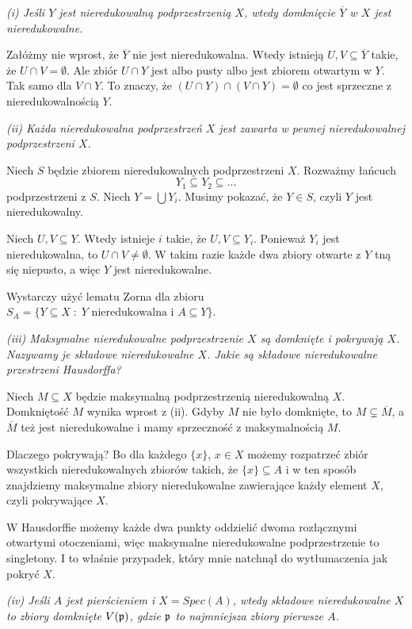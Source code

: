 \documentclass{article}
\begin{document}
\emph{\color{pink}(i) Jeśli $Y$ jest nieredukowalną podprzestrzenią $X$, wtedy domknięcie $\overline Y$ w $X$ jest nieredukowalne.}

Załóżmy nie wprost, że $\overline Y$ nie jest nieredukowalna. Wtedy istnieją $U, V\subseteq \overline Y$ takie, że $U\cap V=\emptyset$. Ale zbiór $U\cap Y$ jest albo pusty albo jest zbiorem otwartym w $Y$. Tak samo dla $V\cap Y$. To znaczy, że $(U\cap Y)\cap(V\cap Y)=\emptyset$ co jest sprzeczne z nieredukowalnością $Y$.

\emph{\color{pink}(ii) Każda nieredukowalna podprzestrzeń $X$ jest zawarta w pewnej nieredukowalnej podprzestrzeni $X$.}

Niech $S$ będzie zbiorem nieredukowalnych podprzestrzeni $X$. Rozważmy łańcuch
$$Y_1\subseteq Y_2\subseteq...$$
podprzestrzeni z $S$. Niech $Y=\bigcup Y_i$. Musimy pokazać, że $Y\in S$, czyli $Y$ jest nieredukowalny.

Niech $U,V\subseteq Y$. Wtedy istnieje $i$ takie, że $U,V\subseteq Y_i$. Ponieważ $Y_i$ jest nieredukowalna, to $U\cap V\neq\emptyset$. W takim razie każde dwa zbiory otwarte z $Y$ tną się niepusto, a więc $Y$ jest nieredukowalne.

Wystarczy użyć lematu Zorna dla zbioru $S_A=\{Y\subseteq X\;:\;Y\text{ nieredukowalna i }A\subseteq Y\}$.

\emph{\color{pink}(iii) Maksymalne nieredukowalne podprzestrzenie $X$ są domknięte i pokrywają $X$. Nazywamy je składowe nieredukowalne $X$. Jakie są składowe nieredukowalne przestrzeni Hausdorffa?}

Niech $M\subseteq X$ będzie maksymalną podprzestrzenią nieredukowalną $X$. Domkniętość $M$ wynika wprost z (ii). Gdyby $M$ nie było domknięte, to $M\subsetneq\overline M$, a $\overline M$ też jest nieredukowalne i mamy sprzeczność z maksymalnością $M$.

Dlaczego pokrywają? Bo dla każdego $\{x\}$, $x\in X$ możemy rozpatrzeć zbiór wszystkich nieredukowalnych zbiorów takich, że $\{x\}\subseteq A$ i w ten sposób znajdziemy maksymalne zbiory nieredukowalne zawierające każdy element $X$, czyli pokrywające $X$.

W Hausdorffie możemy każde dwa punkty oddzielić dwoma rozłącznymi otwartymi otoczeniami, więc maksymalne nieredukowalne podprzestrzenie to singletony. I to właśnie przypadek, który mnie natchnął do wytłumaczenia jak pokryć $X$.

\emph{\color{yellow}(iv) Jeśli $A$ jest pierścieniem i $X=Spec(A)$, wtedy składowe nieredukowalne $X$ to zbiory domknięte $V(\mathfrak{p})$, gdzie $\mathfrak{p}$ to najmniejsza zbiory pierwsze $A$.}
\end{document}

